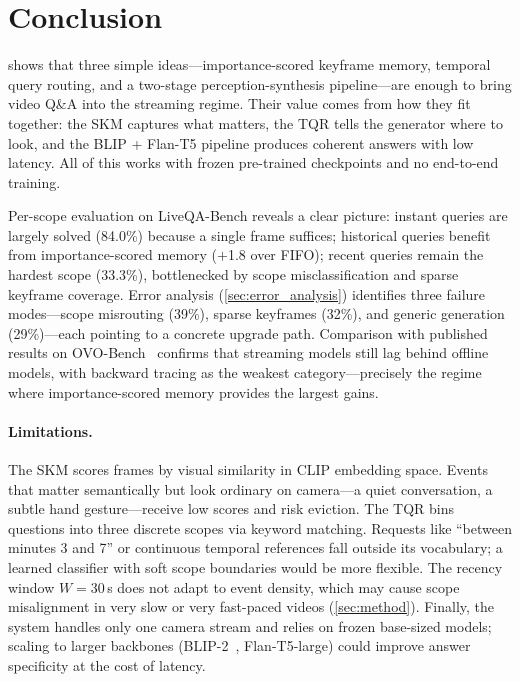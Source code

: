 \section{Conclusion}
\label{sec:conclusion}

\ours shows that three simple ideas---importance-scored keyframe memory, temporal query routing, and a two-stage perception-synthesis pipeline---are enough to bring video Q\&A into the streaming regime.
Their value comes from how they fit together: the SKM captures what matters, the TQR tells the generator where to look, and the BLIP + Flan-T5 pipeline produces coherent answers with low latency.
All of this works with frozen pre-trained checkpoints and no end-to-end training.

Per-scope evaluation on LiveQA-Bench reveals a clear picture:
instant queries are largely solved (84.0\%) because a single frame suffices;
historical queries benefit from importance-scored memory ($+$1.8 over FIFO);
recent queries remain the hardest scope (33.3\%), bottlenecked by scope misclassification and sparse keyframe coverage.
Error analysis (\cref{sec:error_analysis}) identifies three failure modes---scope misrouting (39\%), sparse keyframes (32\%), and generic generation (29\%)---each pointing to a concrete upgrade path.
Comparison with published results on OVO-Bench~\cite{li2025ovobench} confirms that streaming models still lag behind offline models, with backward tracing as the weakest category---precisely the regime where importance-scored memory provides the largest gains.

\paragraph{Limitations.}
The SKM scores frames by visual similarity in CLIP embedding space. Events that matter semantically but look ordinary on camera---a quiet conversation, a subtle hand gesture---receive low scores and risk eviction.
The TQR bins questions into three discrete scopes via keyword matching. Requests like ``between minutes 3 and 7'' or continuous temporal references fall outside its vocabulary; a learned classifier with soft scope boundaries would be more flexible.
The recency window $W\!=\!30$\,s does not adapt to event density, which may cause scope misalignment in very slow or very fast-paced videos (\cref{sec:method}).
Finally, the system handles only one camera stream and relies on frozen base-sized models; scaling to larger backbones (\eg BLIP-2~\cite{li2023blip2}, Flan-T5-large) could improve answer specificity at the cost of latency.

